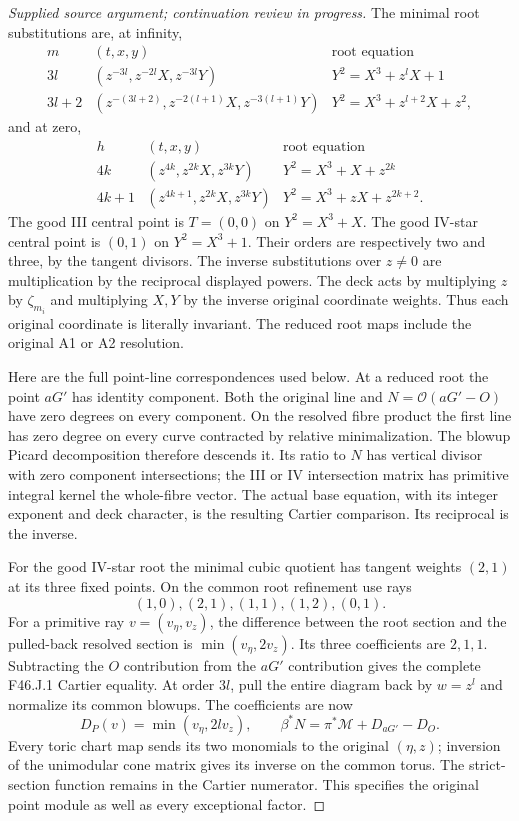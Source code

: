 \begin{proof}[Supplied source argument; continuation review in progress]
The minimal root substitutions are, at infinity,
\[
\begin{array}{c|c|c}
m&(t,x,y)&\text{root equation}\\ \hline
3l&(z^{-3l},z^{-2l}X,z^{-3l}Y)&Y^2=X^3+z^lX+1\\
3l+2&(z^{-(3l+2)},z^{-2(l+1)}X,z^{-3(l+1)}Y)
 &Y^2=X^3+z^{l+2}X+z^2,
\end{array}                                                        \tag{RJC.4}
\]
and at zero,
\[
\begin{array}{c|c|c}
h&(t,x,y)&\text{root equation}\\ \hline
4k&(z^{4k},z^{2k}X,z^{3k}Y)&Y^2=X^3+X+z^{2k}\\
4k+1&(z^{4k+1},z^{2k}X,z^{3k}Y)
 &Y^2=X^3+zX+z^{2k+2}.
\end{array}                                                        \tag{RJC.5}
\]
The good III central point is \(T=(0,0)\) on \(Y^2=X^3+X\).
The good IV-star central point is \((0,1)\) on \(Y^2=X^3+1\).
Their orders are respectively two and three, by the tangent divisors.
The inverse substitutions over \(z\ne0\) are multiplication by the
reciprocal displayed powers. The deck acts by multiplying \(z\) by
\(\zeta_{m_i}\) and multiplying \(X,Y\) by the inverse original
coordinate weights. Thus each original coordinate is literally
invariant. The reduced root maps include the original A1 or A2
resolution.

Here are the full point-line correspondences used below. At a reduced
root the point \(aG'\) has identity component. Both the original line
and \(N=\mathcal O(aG'-O)\) have zero degrees on every component. On
the resolved fibre product the first line has zero degree on every
curve contracted by relative minimalization. The blowup Picard
decomposition therefore descends it. Its ratio to \(N\) has vertical
divisor with zero component intersections; the III or IV intersection
matrix has primitive integral kernel the whole-fibre vector. The
actual base equation, with its integer exponent and deck character,
is the resulting Cartier comparison. Its reciprocal is the inverse.

For the good IV-star root the minimal cubic quotient has tangent
weights \((2,1)\) at its three fixed points. On the common root
refinement use rays
\[
 (1,0),(2,1),(1,1),(1,2),(0,1).
 \tag{RJC.19}
\]
For a primitive ray \(v=(v_\eta,v_z)\), the difference between the
root section and the pulled-back resolved section is
\(\min(v_\eta,2v_z)\). Its three coefficients are \(2,1,1\).
Subtracting the \(O\) contribution from the \(aG'\) contribution
gives the complete F46.J.1 Cartier equality. At order \(3l\), pull
the entire diagram back by \(w=z^l\) and normalize its common
blowups. The coefficients are now
\[
 D_P(v)=\min(v_\eta,2l v_z),\qquad
 \beta^*N=\pi^*\mathcal M+D_{aG'}-D_O.
 \tag{RJC.20}
\]
Every toric chart map sends its two monomials to the original
\((\eta,z)\); inversion of the unimodular cone matrix gives its
inverse on the common torus. The strict-section function remains
in the Cartier numerator. This specifies the original point module
as well as every exceptional factor.


\end{proof}
